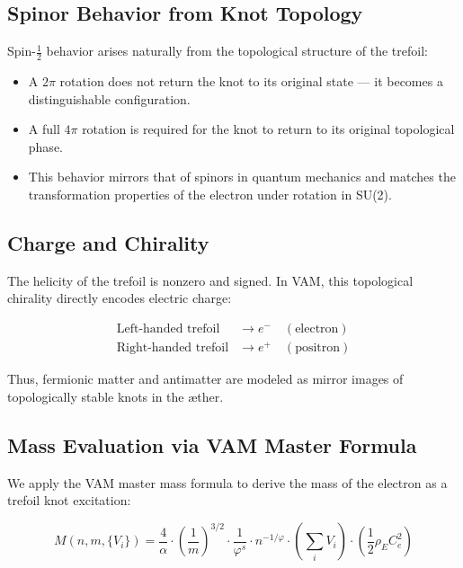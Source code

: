 \subsection{Spinor Behavior from Knot Topology}

Spin-\(\tfrac{1}{2}\) behavior arises naturally from the topological structure of the trefoil:

\begin{itemize}
    \item A \(2\pi\) rotation does not return the knot to its original state — it becomes a distinguishable configuration.
    \item A full \(4\pi\) rotation is required for the knot to return to its original topological phase.
    \item This behavior mirrors that of spinors in quantum mechanics and matches the transformation properties of the electron under rotation in SU(2).
\end{itemize}

\subsection{Charge and Chirality}

The helicity of the trefoil is nonzero and signed. In VAM, this topological chirality directly encodes electric charge:

\begin{align*}
\text{Left-handed trefoil} &\rightarrow e^- \quad (\text{electron}) \\
\text{Right-handed trefoil} &\rightarrow e^+ \quad (\text{positron})
\end{align*}

Thus, fermionic matter and antimatter are modeled as mirror images of topologically stable knots in the æther.

\subsection{Mass Evaluation via VAM Master Formula}

We apply the VAM master mass formula to derive the mass of the electron as a trefoil knot excitation:

\begin{equation}
\boxed{
M(n, m, \{V_i\}) = \frac{4}{\alpha} \cdot \left( \frac{1}{m} \right)^{3/2} \cdot \frac{1}{\varphi^s} \cdot n^{-1/\varphi} \cdot \left( \sum_i V_i \right) \cdot \left( \frac{1}{2} \rho_{\scriptscriptstyle\boldsymbol\!E}C_e^2 \right)
}
\end{equation}

